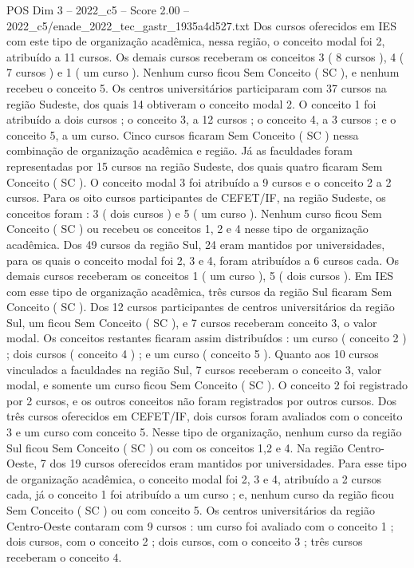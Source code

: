 \begin{textsample}{POS Dim 3 – 2022\_c5 – Score 2.00 – 2022\_c5/enade\_2022\_tec\_gastr\_1935a4d527.txt}
Dos cursos oferecidos em IES com este tipo de organização acadêmica, nessa região, o conceito modal foi 2, atribuído a 11 cursos.
Os demais cursos receberam os conceitos 3 ( 8 cursos ), 4 ( 7 cursos ) e 1 ( um curso ).
Nenhum curso ficou Sem Conceito ( SC ), e nenhum recebeu o conceito 5.
Os centros universitários participaram com 37 cursos na região Sudeste, dos quais 14 obtiveram o conceito modal 2.
O conceito 1 foi atribuído a dois cursos ; o conceito 3, a 12 cursos ; o conceito 4, a 3 cursos ; e o conceito 5, a um curso.
Cinco cursos ficaram Sem Conceito ( SC ) nessa combinação de organização acadêmica e região.
Já as faculdades foram representadas por 15 cursos na região Sudeste, dos quais quatro ficaram Sem Conceito ( SC ).
O conceito modal 3 foi atribuído a 9 cursos e o conceito 2 a 2 cursos.
Para os oito cursos participantes de CEFET/IF, na região Sudeste, os conceitos foram : 3 ( dois cursos ) e 5 ( um curso ).
Nenhum curso ficou Sem Conceito ( SC ) ou recebeu os conceitos 1, 2 e 4 nesse tipo de organização acadêmica.
Dos 49 cursos da região Sul, 24 eram mantidos por universidades, para os quais o conceito modal foi 2, 3 e 4, foram atribuídos a 6 cursos cada.
Os demais cursos receberam os conceitos 1 ( um curso ), 5 ( dois cursos ).
Em IES com esse tipo de organização acadêmica, três cursos da região Sul ficaram Sem Conceito ( SC ).
Dos 12 cursos participantes de centros universitários da região Sul, um ficou Sem Conceito ( SC ), e 7 cursos receberam conceito 3, o valor modal.
Os conceitos restantes ficaram assim distribuídos : um curso ( conceito 2 ) ; dois cursos ( conceito 4 ) ; e um curso ( conceito 5 ).
Quanto aos 10 cursos vinculados a faculdades na região Sul, 7 cursos receberam o conceito 3, valor modal, e somente um curso ficou Sem Conceito ( SC ).
O conceito 2 foi registrado por 2 cursos, e os outros conceitos não foram registrados por outros cursos.
Dos três cursos oferecidos em CEFET/IF, dois cursos foram avaliados com o conceito 3 e um curso com conceito 5.
Nesse tipo de organização, nenhum curso da região Sul ficou Sem Conceito ( SC ) ou com os conceitos 1,2 e 4.
Na região Centro-Oeste, 7 dos 19 cursos oferecidos eram mantidos por universidades.
Para esse tipo de organização acadêmica, o conceito modal foi 2, 3 e 4, atribuído a 2 cursos cada, já o conceito 1 foi atribuído a um curso ; e, nenhum curso da região ficou Sem Conceito ( SC ) ou com conceito 5.
Os centros universitários da região Centro-Oeste contaram com 9 cursos : um curso foi avaliado com o conceito 1 ; dois cursos, com o conceito 2 ; dois cursos, com o conceito 3 ; três cursos receberam o conceito 4.

\end{textsample}
